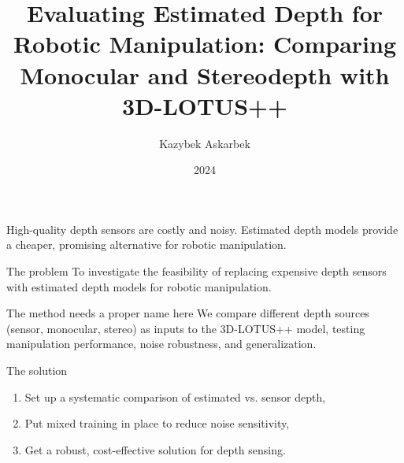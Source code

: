 \documentclass[12pt,pdf,hyperref={unicode}]{beamer}
\title{ Evaluating Estimated Depth for Robotic Manipulation: Comparing Monocular and Stereodepth with 3D-LOTUS++}
\author{Kazybek Askarbek}
\institute[HSE]{}
\date{2024}
\begin{document}
\titlepage
\begin{frame}{}
High-quality depth sensors are costly and noisy. Estimated depth models provide a cheaper, promising alternative for robotic manipulation.
\begin{block}{The problem}
To investigate the feasibility of replacing expensive depth sensors with estimated depth models for robotic manipulation.
\end{block}
\begin{block}{The method needs a proper name here}
We compare different depth sources (sensor, monocular, stereo) as inputs to the 3D-LOTUS++ model, testing manipulation performance, noise robustness, and generalization.
\end{block}
\begin{block}{The solution} 
\begin{enumerate}[1)]
\item Set up a systematic comparison of estimated vs. sensor depth,
\item Put mixed training in place to reduce noise sensitivity,
\item Get a robust, cost-effective solution for depth sensing.
\end{enumerate}
\end{block}
\end{frame}
\end{document}
